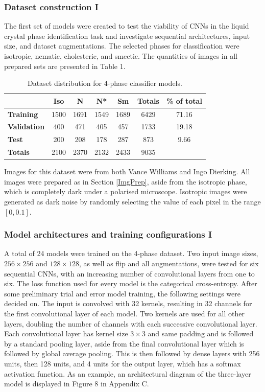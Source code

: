 \documentclass[12pt]{article}
\begin{document}
\subsubsection{Dataset construction I}
The first set of models were created to test the viability of CNNs in the liquid crystal phase identification task and investigate sequential architectures, input size, and dataset augmentations. The selected phases for classification were isotropic, nematic, cholesteric, and smectic. The quantities of images in all prepared sets are presented in Table 1.
\begin{table}[!htb]
\begin{center}
\caption{Dataset distribution for 4-phase classifier models.}
\begin{tabular}{l|c|c|c|c|c|c}
\toprule
& \textbf{Iso} & \textbf{N} & \textbf{N*} & \textbf{Sm} & \textbf{Totals} & \textbf{\% of total}\\
\midrule
\textbf{Training} & 1500 & 1691 & 1549 & 1689 & 6429 & 71.16\\
\textbf{Validation} & 400 & 471 & 405 & 457 & 1733 & 19.18\\
\textbf{Test} & 200 & 208 & 178 & 287 & 873 & 9.66\\
\midrule
\textbf{Totals} & 2100 & 2370 & 2132 & 2433 & 9035\\
\bottomrule
\end{tabular}
\end{center}
\end{table}
Images for this dataset were from both Vance Williams and Ingo Dierking. All images were prepared as in Section \ref{ImgPrep}, aside from the isotropic phase, which is completely dark under a polarised microscope. Isotropic images were generated as dark noise by randomly selecting the value of each pixel in the range $[0,0.1]$. 
\subsubsection{Model architectures and training configurations I}
A total of 24 models were trained on the 4-phase dataset. Two input image sizes, $256 \times 256$ and $128 \times 128$, as well as flip and all augmentations, were tested for six sequential CNNs, with an increasing number of convolutional layers from one to six.  The loss function used for every model is the categorical cross-entropy. After some preliminary trial and error model training, the following settings were decided on. The input is convolved with 32 kernels, resulting in 32 channels for the first convolutional layer of each model. Two kernels are used for all other layers, doubling the number of channels with each successive convolutional layer. Each convolutional layer has kernel size $3 \times 3$ and same padding and is followed by a standard pooling layer, aside from the final convolutional layer which is followed by global average pooling. This is then followed by dense layers with 256 units, then 128 units, and 4 units for the output layer, which has a softmax activation function. As an example, an architectural diagram of the three-layer model is displayed in Figure 8 in Appendix C.
\end{document}
